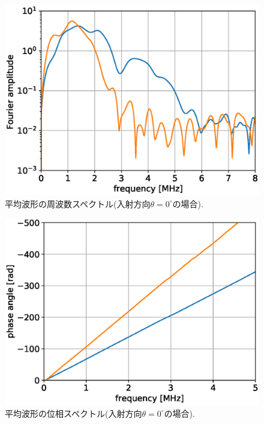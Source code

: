\begin{figure}[h]
	\begin{center}
	\includegraphics[width=0.6\linewidth]{Figs/fig9.eps} 
	\end{center}
	\caption{
		平均波形の周波数スペクトル(入射方向$\theta=0^{\circ}の場合$).
	} 
	\label{fig:fig9}
\end{figure}
\begin{figure}[h]
	\begin{center}
	\includegraphics[width=0.7\linewidth]{Figs/fig10.eps} 
	\end{center}
	\caption{
		平均波形の位相スペクトル(入射方向$\theta=0^{\circ}$の場合).
	} 
	\label{fig:fig10}
\end{figure}
